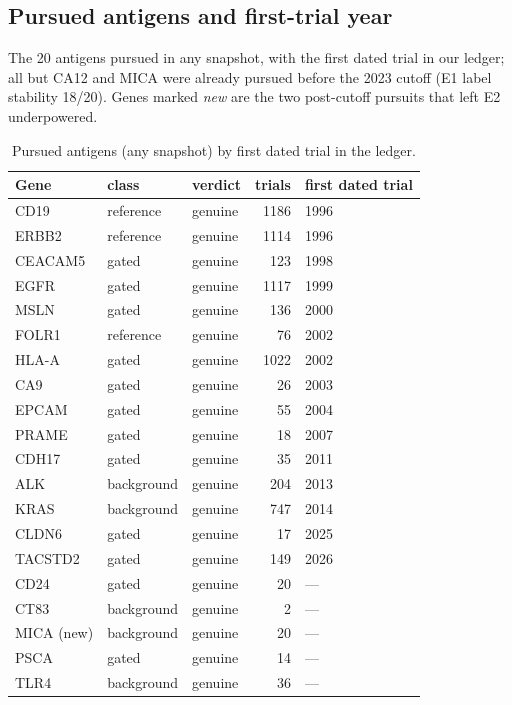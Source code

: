 \subsection{Pursued antigens and first-trial year}
The 20 antigens pursued in any snapshot, with the first dated trial in our ledger; all but CA12 and MICA were already pursued before the 2023 cutoff (E1 label stability 18/20). Genes marked \emph{new} are the two post-cutoff pursuits that left E2 underpowered.
\begin{table}[h]\centering\small\caption{Pursued antigens (any snapshot) by first dated trial in the ledger.}\label{tab:pursuedyears}
\begin{tabular}{lllrl}\hline\hline Gene & class & verdict & trials & first dated trial\\\hline
CD19 & reference & genuine & 1186 & 1996\\
ERBB2 & reference & genuine & 1114 & 1996\\
CEACAM5 & gated & genuine & 123 & 1998\\
EGFR & gated & genuine & 1117 & 1999\\
MSLN & gated & genuine & 136 & 2000\\
FOLR1 & reference & genuine & 76 & 2002\\
HLA-A & gated & genuine & 1022 & 2002\\
CA9 & gated & genuine & 26 & 2003\\
EPCAM & gated & genuine & 55 & 2004\\
PRAME & gated & genuine & 18 & 2007\\
CDH17 & gated & genuine & 35 & 2011\\
ALK & background & genuine & 204 & 2013\\
KRAS & background & genuine & 747 & 2014\\
CLDN6 & gated & genuine & 17 & 2025\\
TACSTD2 & gated & genuine & 149 & 2026\\
CD24 & gated & genuine & 20 & ---\\
CT83 & background & genuine & 2 & ---\\
MICA (new) & background & genuine & 20 & ---\\
PSCA & gated & genuine & 14 & ---\\
TLR4 & background & genuine & 36 & ---\\
\hline\end{tabular}\end{table}
